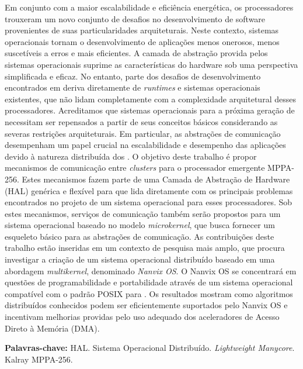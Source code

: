 
\begin{resumo}[Resumo]
	Em conjunto com a maior escalabilidade e eficiência energética, os
	processadores \textit{\lightweight \manycores} trouxeram um novo
	conjunto de desafios no desenvolvimento de software provenientes
	de suas particularidades arquiteturais. Neste contexto, sistemas
	operacionais tornam o desenvolvimento de aplicações menos onerosos,
	menos suscetíveis a erros e mais eficientes. A camada de abstração
	provida pelos sistemas operacionais suprime as características do
	hardware sob uma perspectiva simplificada e eficaz. No entanto,
	parte dos desafios de desenvolvimento encontrados em \textit{\lightweight \manycores}
	deriva diretamente de \textit{runtimes} e sistemas operacionais
	existentes, que não lidam completamente com a complexidade arquitetural
	desses processadores. Acreditamos que sistemas operacionais para a
	próxima geração de \textit{\lightweight \manycores} necessitam ser
	repensados a partir de seus conceitos básicos considerando as severas
	restrições arquiteturais. Em particular, as abstrações de comunicação
	desempenham um papel crucial na escalabilidade e desempenho das
	aplicações devido à natureza distribuída dos \textit{\manycores}.
	O objetivo deste trabalho é propor mecanismos de comunicação entre
	\textit{clusters} para o processador \textit{\manycore} emergente MPPA-256.
	Estes mecanismos fazem parte de uma Camada de Abstração de Hardware (HAL)
	genérica e flexível para \textit{\lightweight \manycores} que lida
	diretamente com os principais problemas encontrados no projeto de um
	sistema operacional para esses processadores. Sob estes mecanismos,
	serviços de comunicação também serão propostos para um sistema
	operacional baseado no modelo \textit{microkernel}, que busca fornecer
	um esqueleto básico para as abstrações de comunicação. As contribuições
	deste trabalho estão inseridas em um contexto de pesquisa mais
	amplo, que procura investigar a criação de um sistema operacional
	distribuído baseado em uma abordagem \textit{multikernel}, denominado
	\textit{Nanvix OS}. O Nanvix OS se concentrará em questões de
	programabilidade e portabilidade através de um sistema operacional
	compatível com o padrão POSIX para \textit{\lightweight \manycore}. Os
	resultados mostram como algoritmos distribuídos conhecidos podem
	ser eficientemente suportados pelo Nanvix OS e incentivam melhorias
	providas pelo uso adequado dos aceleradores de Acesso Direto à Memória (DMA).

	\vspace{\baselineskip}
	\textbf{Palavras-chave:} HAL. Sistema Operacional Distribuído. \textit{Lightweight Manycore}. Kalray MPPA-256.
\end{resumo}

